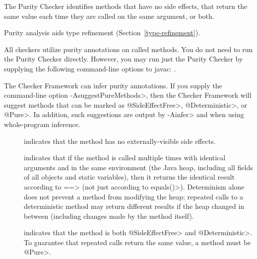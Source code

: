 \htmlhr
{}

The Purity Checker identifies methods that have no side effects, that
return the same value each time they are called on the same argument, or both.

Purity analysis aids type refinement (Section~\ref{type-refinement}).

All checkers utilize purity annotations on called methods.
You do not need to run the Purity Checker directly.
However, you may run just the Purity Checker by
supplying the following command-line options to javac:
.

The Checker Framework can infer purity annotations.
If you supply the command-line option \<-AsuggestPureMethods>, then the
Checker Framework will suggest methods that can be marked as
\<@SideEffectFree>, \<@Deterministic>, or \<@Pure>.
In addition, such suggestions are output by \<-Ainfer> and when using
whole-program inference.



\begin{description}

\item[]
  indicates that the method has no externally-visible side effects.

\item[]
  indicates that if the method is called multiple times with identical
  arguments and in the same environment (the Java heap, including all
  fields of all objects and static variables), then it returns the
  identical result according to \<==> (not just according to \<equals()>).
  Determinism alone does not prevent a method from modifying the heap;
  repeated calls to a deterministic method may return different results if
  the heap changed in between (including changes made by the method itself).

\item[]
  indicates that the method is both \<@SideEffectFree> and \<@Deterministic>.
  To guarantee that repeated calls return the same value, a method must be
  \<@Pure>.

\end{description}



